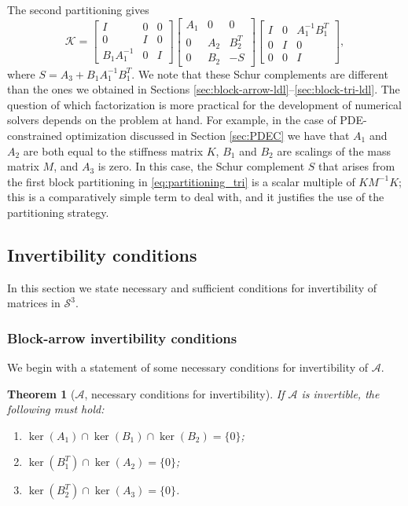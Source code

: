 \documentclass{article}
\newtheorem{theorem}{Theorem}
\newcommand{\st}{\mathcal{S}^3}
\newcommand{\sA}{\mathcal{A}}
\newcommand{\sK}{\mathcal{K}}
\begin{document}
The second partitioning gives
\[
\sK = \begin{bmatrix}
    I & 0 & 0 \\
    0 & I & 0 \\
    B_1A_1^{-1} & 0 & I
\end{bmatrix} \begin{bmatrix}
    A_1 & 0 & 0 \\
    0 & A_2 & B_2^T \\
    0 & B_2 & -S
\end{bmatrix}\begin{bmatrix}
    I & 0 & A_1^{-1}B_1^T \\
    0 & I & 0 \\
    0 & 0 & I
\end{bmatrix},
\]
where $S = A_3 + B_1 A_1^{-1} B_1^T$.
We note that these Schur complements are different than the ones we obtained in Sections \ref{sec:block-arrow-ldl}--\ref{sec:block-tri-ldl}.  The question of which factorization is more practical for the development of numerical solvers depends on the problem at hand. For example, in the case of PDE-constrained optimization discussed in Section \ref{sec:PDEC} we have that $A_1$ and $A_2$ are both equal to the stiffness matrix $K$, $B_1$ and $B_2$ are scalings of the mass matrix $M$, and $A_3$ is zero. In this case, the Schur complement $S$ that arises from the first block partitioning in \eqref{eq:partitioning_tri} is a scalar multiple of $KM^{-1}K$; this is a comparatively simple term to deal with, and it justifies the use of the partitioning strategy.


\subsection{Invertibility conditions}
\label{sec:inv}

In this section we state necessary and sufficient conditions for invertibility of matrices in $\st$. %

\subsubsection{Block-arrow invertibility conditions}

We begin with a statement of some necessary conditions for invertibility of $\sA$.

\begin{theorem}[$\sA$, necessary conditions for invertibility]
    If $\sA$ is invertible, the following must hold:

    \begin{enumerate}[label=(\roman*)]
        \item $\ker(A_1) \cap \ker(B_1) \cap \ker(B_2) = \{ 0 \}$;
        \item $\ker(B_1^T) \cap \ker(A_2) = \{ 0 \}$;
        \item $\ker(B_2^T) \cap \ker(A_3) = \{ 0 \}$.
    \end{enumerate}
\end{theorem}
\end{document}
